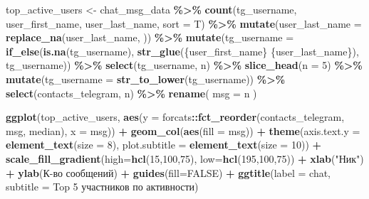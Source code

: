 \documentclass[
]{book}
\newenvironment{Shaded}{\begin{snugshade}}{\end{snugshade}}
\newcommand{\AttributeTok}[1]{\textcolor[rgb]{0.13,0.29,0.53}{#1}}
\newcommand{\ConstantTok}[1]{\textcolor[rgb]{0.56,0.35,0.01}{#1}}
\newcommand{\DecValTok}[1]{\textcolor[rgb]{0.00,0.00,0.81}{#1}}
\newcommand{\FunctionTok}[1]{\textcolor[rgb]{0.13,0.29,0.53}{\textbf{#1}}}
\newcommand{\NormalTok}[1]{#1}
\newcommand{\OtherTok}[1]{\textcolor[rgb]{0.56,0.35,0.01}{#1}}
\newcommand{\SpecialCharTok}[1]{\textcolor[rgb]{0.81,0.36,0.00}{\textbf{#1}}}
\newcommand{\StringTok}[1]{\textcolor[rgb]{0.31,0.60,0.02}{#1}}
\begin{document}
\begin{Shaded}
\begin{Highlighting}[]
\NormalTok{    top\_active\_users }\OtherTok{\textless{}{-}}\NormalTok{ chat\_msg\_data }\SpecialCharTok{\%\textgreater{}\%} 
      \FunctionTok{count}\NormalTok{(tg\_username, user\_first\_name, user\_last\_name, }\AttributeTok{sort =}\NormalTok{ T) }\SpecialCharTok{\%\textgreater{}\%} 
      \FunctionTok{mutate}\NormalTok{(}\AttributeTok{user\_last\_name =} \FunctionTok{replace\_na}\NormalTok{(user\_last\_name, }\StringTok{\textquotesingle{}\textquotesingle{}}\NormalTok{)) }\SpecialCharTok{\%\textgreater{}\%} 
      \FunctionTok{mutate}\NormalTok{(}\AttributeTok{tg\_username =} \FunctionTok{if\_else}\NormalTok{(}\FunctionTok{is.na}\NormalTok{(tg\_username), }\FunctionTok{str\_glue}\NormalTok{(}\StringTok{\textquotesingle{}\{user\_first\_name\} \{user\_last\_name\}\textquotesingle{}}\NormalTok{), tg\_username)) }\SpecialCharTok{\%\textgreater{}\%} 
      \FunctionTok{select}\NormalTok{(tg\_username, n) }\SpecialCharTok{\%\textgreater{}\%} 
      \FunctionTok{slice\_head}\NormalTok{(}\AttributeTok{n =} \DecValTok{5}\NormalTok{) }\SpecialCharTok{\%\textgreater{}\%} 
      \FunctionTok{mutate}\NormalTok{(}\AttributeTok{tg\_username =} \FunctionTok{str\_to\_lower}\NormalTok{(tg\_username)) }\SpecialCharTok{\%\textgreater{}\%} 
      \FunctionTok{select}\NormalTok{(}\StringTok{\textquotesingle{}contacts\_telegram\textquotesingle{}}\NormalTok{, }\StringTok{\textquotesingle{}n\textquotesingle{}}\NormalTok{) }\SpecialCharTok{\%\textgreater{}\%} 
      \FunctionTok{rename}\NormalTok{( }\AttributeTok{msg =}\NormalTok{ n ) }
    
    \FunctionTok{ggplot}\NormalTok{(top\_active\_users, }\FunctionTok{aes}\NormalTok{(}\AttributeTok{y =}\NormalTok{ forcats}\SpecialCharTok{::}\FunctionTok{fct\_reorder}\NormalTok{(contacts\_telegram, msg, median), }\AttributeTok{x =}\NormalTok{ msg)) }\SpecialCharTok{+}
      \FunctionTok{geom\_col}\NormalTok{(}\FunctionTok{aes}\NormalTok{(}\AttributeTok{fill =}\NormalTok{ msg)) }\SpecialCharTok{+}
      \FunctionTok{theme}\NormalTok{(}\AttributeTok{axis.text.y =} \FunctionTok{element\_text}\NormalTok{(}\AttributeTok{size =} \DecValTok{8}\NormalTok{), }
            \AttributeTok{plot.subtitle =} \FunctionTok{element\_text}\NormalTok{(}\AttributeTok{size =} \DecValTok{10}\NormalTok{)) }\SpecialCharTok{+}
      \FunctionTok{scale\_fill\_gradient}\NormalTok{(}\AttributeTok{high=}\FunctionTok{hcl}\NormalTok{(}\DecValTok{15}\NormalTok{,}\DecValTok{100}\NormalTok{,}\DecValTok{75}\NormalTok{), }\AttributeTok{low=}\FunctionTok{hcl}\NormalTok{(}\DecValTok{195}\NormalTok{,}\DecValTok{100}\NormalTok{,}\DecValTok{75}\NormalTok{)) }\SpecialCharTok{+}
      \FunctionTok{xlab}\NormalTok{(}\StringTok{"Ник"}\NormalTok{) }\SpecialCharTok{+}
      \FunctionTok{ylab}\NormalTok{(}\StringTok{\textquotesingle{}К{-}во сообщений\textquotesingle{}}\NormalTok{) }\SpecialCharTok{+}
      \FunctionTok{guides}\NormalTok{(}\AttributeTok{fill=}\ConstantTok{FALSE}\NormalTok{) }\SpecialCharTok{+}
      \FunctionTok{ggtitle}\NormalTok{(}\AttributeTok{label =}\NormalTok{ chat, }\AttributeTok{subtitle =} \StringTok{\textquotesingle{}Top 5 участников по активности\textquotesingle{}}\NormalTok{)}
    

\end{Highlighting}
\end{Shaded}
\end{document}
